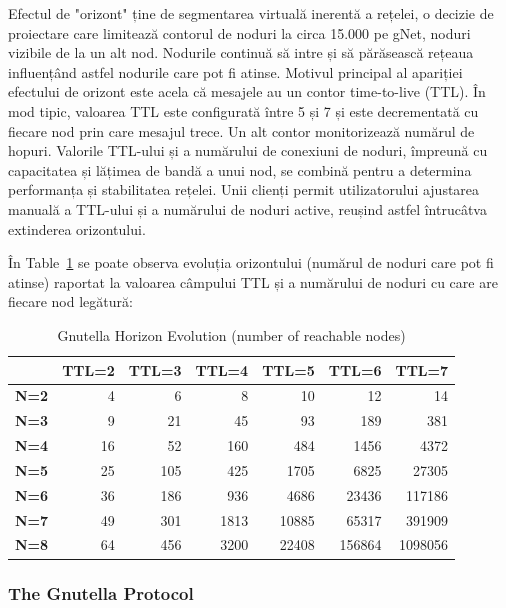 Efectul de "orizont" ține de segmentarea virtuală inerentă a rețelei, o
decizie de proiectare care limitează contorul de noduri la circa 15.000 pe
gNet, noduri vizibile de la un alt nod. Nodurile continuă să intre și să
părăsească rețeaua influențând astfel nodurile care pot fi atinse. Motivul
principal al apariției efectului de orizont este acela că mesajele au un
contor time-to-live (TTL). În mod tipic, valoarea TTL este configurată între 5
și 7 și este decrementată cu fiecare nod prin care mesajul trece. Un alt
contor monitorizează numărul de hopuri. Valorile TTL-ului și a numărului de
conexiuni de noduri, împreună cu capacitatea și lățimea de bandă a unui nod,
se combină pentru a determina performanța și stabilitatea rețelei. Unii
clienți permit utilizatorului ajustarea manuală a TTL-ului și a numărului de
noduri active, reușind astfel întrucâtva extinderea orizontului.

În Table~\ref{tab:p2p-systems:gnutella-horizon} se poate observa evoluția
orizontului (numărul de noduri care pot fi atinse) raportat la valoarea
câmpului TTL și a numărului de noduri cu care are fiecare nod legătură:

\begin{table}[htb]
  \centering
  \caption{Gnutella Horizon Evolution (number of reachable nodes)}
  \label{tab:p2p-systems:gnutella-horizon}
  \begin{tabular}{@{}lrrrrrr@{}}
    \toprule
      & \textbf{TTL=2} & \textbf{TTL=3} & \textbf{TTL=4} & \textbf{TTL=5} &
      \textbf{TTL=6} & \textbf{TTL=7} \\
    \midrule
      \textbf{N=2} & 4 & 6 & 8 & 10 & 12 & 14 \\
      \textbf{N=3} & 9 & 21 & 45 & 93 & 189 & 381 \\
      \textbf{N=4} & 16 & 52 & 160 & 484 & 1456 & 4372 \\
      \textbf{N=5} & 25 & 105 & 425 & 1705 & 6825 & 27305 \\
      \textbf{N=6} & 36 & 186 & 936 & 4686 & 23436 & 117186 \\
      \textbf{N=7} & 49 & 301 & 1813 & 10885 & 65317 & 391909 \\
      \textbf{N=8} & 64 & 456 & 3200 & 22408 & 156864 & 1098056 \\
    \bottomrule
  \end{tabular}
\end{table}

\subsubsection{The Gnutella Protocol}

